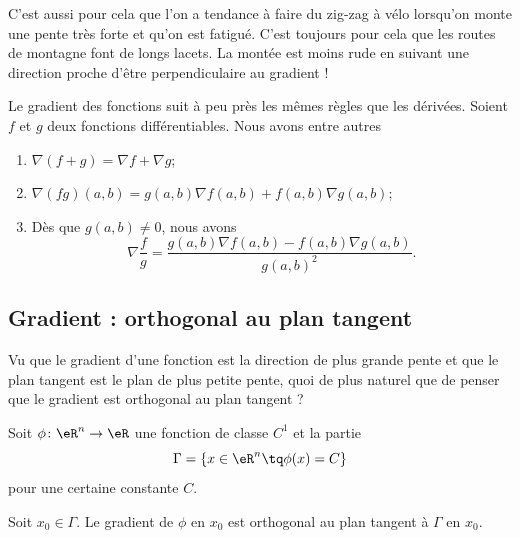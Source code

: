 C'est aussi pour cela que l'on a tendance à faire du zig-zag à vélo lorsqu'on monte une pente très forte et qu'on est fatigué. C'est toujours pour cela que les routes de montagne font de longs lacets. La montée est moins rude en suivant une direction proche d'être perpendiculaire au gradient !

\begin{theorem}
    Le gradient des fonctions suit à peu près les mêmes règles que les dérivées. Soient $f$ et $g$ deux fonctions différentiables. Nous avons entre autres
    \begin{enumerate}
        \item
            $\nabla(f+g)=\nabla f+\nabla g$;
        \item
            $\nabla(fg)(a,b)=g(a,b)\nabla f(a,b)+f(a,b)\nabla g(a,b)$;
        \item
            Dès que $g(a,b)\neq 0$, nous avons
            \begin{equation}
                \nabla\frac{ f }{ g }=\frac{ g(a,b)\nabla f(a,b)-f(a,b)\nabla g(a,b) }{ g(a,b)^2 }.
            \end{equation}
    \end{enumerate}
\end{theorem}

\subsection{Gradient : orthogonal au plan tangent}

Vu que le gradient d'une fonction est la direction de plus grande pente et que le plan tangent est le plan de plus petite pente, quoi de plus naturel que de penser que le gradient est orthogonal au plan tangent ?

\begin{lemma}
    Soit \( \phi\colon \eR^n\to \eR\) une fonction de classe \( C^1\) et la partie
    \begin{equation}
        \Gamma=\{ x\in \eR^n\tq \phi(x)=C \}
    \end{equation}
    pour une certaine constante \( C\).

    Soit \( x_0\in \Gamma\). Le gradient de \( \phi\) en \( x_0\) est orthogonal au plan tangent à \( \Gamma\) en \( x_0\).
\end{lemma}

